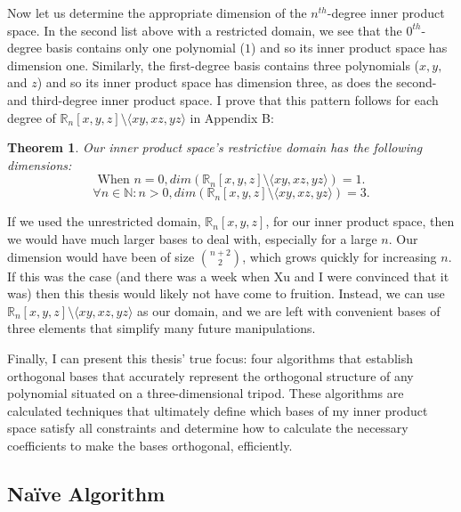 \documentclass[letterpaper, 12pt]{article}
\newtheorem{thm}{Theorem}[section]
\begin{document}
Now let us determine the appropriate dimension of the $n^{th}$-degree inner product space. In the second list above with a restricted domain, we see that the $0^{th}$-degree basis contains only one polynomial ($1$) and so its inner product space has dimension one. Similarly, the first-degree basis contains three polynomials ($x, y,$ and $z$) and so its inner product space has dimension three, as does the second- and third-degree inner product space. I prove that this pattern follows for each degree of $\mathbb{R}_n [x, y, z] \setminus \langle xy, xz, yz\rangle$ in Appendix B:

\begin{thm} Our inner product space's restrictive domain has the following dimensions:
	\vspace{-4mm}
	$$\text{When }n=0, dim(\mathbb{R}_n [x, y, z] \setminus \langle xy, xz, yz\rangle) = 1.$$
	$$\forall n\in \mathbb{N} : n > 0, dim(\mathbb{R}_n [x, y, z] \setminus \langle xy, xz, yz\rangle) = 3.$$
\end{thm}

If we used the unrestricted domain, $\mathbb{R}_n [x, y, z]$, for our inner product space, then we would have much larger bases to deal with, especially for a large $n$. Our dimension would have been of size $\binom{n+2}{2}$, which grows quickly for increasing $n$. If this was the case (and there was a week when Xu and I were convinced that it was) then this thesis would likely not have come to fruition. Instead, we can use $\mathbb{R}_n [x, y, z] \setminus \langle xy, xz, yz\rangle$ as our domain, and we are left with convenient bases of three elements that simplify many future manipulations.

Finally, I can present this thesis' true focus: four algorithms that establish orthogonal bases that accurately represent the orthogonal structure of any polynomial situated on a three-dimensional tripod. These algorithms are calculated techniques that ultimately define which bases of my inner product space satisfy all constraints and determine how to calculate the necessary coefficients to make the bases orthogonal, efficiently.







\newpage
\begin{centering}\section{Na\"ive Algorithm}\end{centering}
\end{document}
